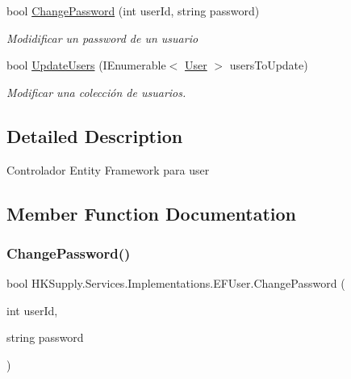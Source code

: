 \begin{DoxyCompactItemize}
bool \hyperlink{class_h_k_supply_1_1_services_1_1_implementations_1_1_e_f_user_ada8f9352d6fed7594d449aed92f452a0}{Change\+Password} (int user\+Id, string password)
\begin{DoxyCompactList}\small\item\em Modidificar un password de un usuario \end{DoxyCompactList}\item 
bool \hyperlink{class_h_k_supply_1_1_services_1_1_implementations_1_1_e_f_user_af7bbea584cce6ec7e2b8f4b4d46c01f6}{Update\+Users} (I\+Enumerable$<$ \hyperlink{class_h_k_supply_1_1_models_1_1_user}{User} $>$ users\+To\+Update)
\begin{DoxyCompactList}\small\item\em Modificar una colección de usuarios. \end{DoxyCompactList}\end{DoxyCompactItemize}


\subsection{Detailed Description}
Controlador Entity Framework para user 



\subsection{Member Function Documentation}
\mbox{\label{class_h_k_supply_1_1_services_1_1_implementations_1_1_e_f_user_ada8f9352d6fed7594d449aed92f452a0}} 
\subsubsection{\texorpdfstring{Change\+Password()}{ChangePassword()}}
{\footnotesize\ttfamily bool H\+K\+Supply.\+Services.\+Implementations.\+E\+F\+User.\+Change\+Password (\begin{DoxyParamCaption}\item[{int}]{user\+Id,  }\item[{string}]{password }\end{DoxyParamCaption})}



